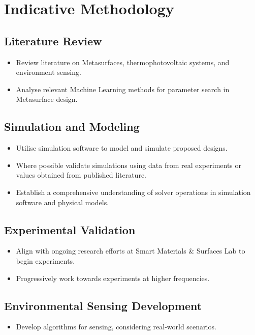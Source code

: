 \section{Indicative Methodology}


\subsection{Literature Review}
\begin{itemize}
    \item Review literature on Metasurfaces, thermophotovoltaic systems, and environment sensing.
    \item Analyse relevant Machine Learning methods for parameter search in Metasurface design.
\end{itemize}

\subsection{Simulation and Modeling}
\begin{itemize}
    \item Utilise simulation software to model and simulate proposed designs.
    \item Where possible validate simulations using data from real experiments or values obtained from published literature.
    \item Establish a comprehensive understanding of solver operations in simulation software and physical models.
\end{itemize}


\subsection{Experimental Validation}
\begin{itemize}
    \item Align with ongoing research efforts at Smart Materials \& Surfaces Lab to begin experiments.
    \item Progressively work towards experiments at higher frequencies.
\end{itemize}

\subsection{Environmental Sensing Development}
\begin{itemize}
    \item Develop algorithms for sensing, considering real-world scenarios.
\end{itemize}

